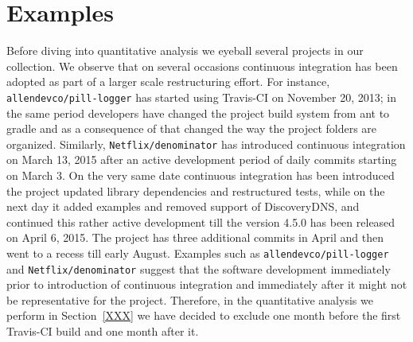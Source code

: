 \section{Examples}
\label{sec:examples}
Before diving into quantitative analysis we eyeball several projects in our collection. 
We observe that on several occasions continuous integration has been adopted as
part of a larger scale restructuring effort. 
For instance, \texttt{allendevco/pill-logger} has started using Travis-CI on November 20,
2013; in the same period developers have changed the project build system from ant to
gradle and as a consequence of that changed the way the project folders are organized.
Similarly, \texttt{Netflix/denominator} has introduced continuous integration on March 13, 2015
after an active development period of daily commits starting on March 3.
On the very same date continuous integration has been introduced 
the project updated library dependencies and restructured tests, while
on the next day it added examples and removed support of DiscoveryDNS, and continued
this rather active development till the version 4.5.0 has been released on April 6, 2015.
The project has three additional commits in April and then went to a recess till early August. 
Examples such as \texttt{allendevco/pill-logger} and \texttt{Netflix/denominator} 
suggest that the software development immediately prior to introduction of continuous 
integration and immediately after it might not be representative for the project.
Therefore, in the quantitative analysis we perform in Section~\ref{XXX} we have decided to
exclude one month before the first Travis-CI build and one month after it.